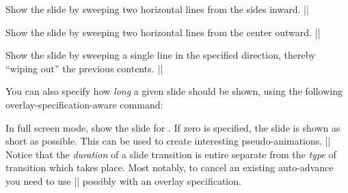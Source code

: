 \begin{command}{\transsplithorizontalin{}}
  Show the slide by sweeping two horizontal lines from the sides inward.
  \example|\transsplithorizontalin|
\end{command}

\begin{command}{\transsplithorizontalout{}}
  Show the slide by sweeping two horizontal lines from the center outward.
  \example|\transsplithorizontalout|
\end{command}

\begin{command}{\transwipe{}}
  Show the slide by sweeping a single line in the specified direction, thereby ``wiping out'' the previous contents.
  \example|\transwipe[direction=90]|
\end{command}

You can also specify how \emph{long} a given slide should be shown, using the following overlay-specification-aware command:
\begin{command}{\transduration{}}
  In full screen mode, show the slide for . If zero is specified, the slide is shown as short as possible. This can be used to create interesting pseudo-animations.
  \example||
  Notice that the \emph{duration} of a slide transition is entire separate from the \emph{type} of transition which takes place. Most notably, to cancel an existing auto-advance you need to use 
  \example|\transduration{}|
possibly with an overlay specification.
\end{command}
